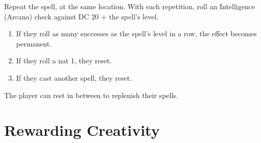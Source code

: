 \documentclass[twocolumn]{dndbook}
\begin{document}
Repeat the spell, at the same location. With each repetition, roll an Intelligence (Arcana) check against DC 20 + the spell's level.
\begin{enumerate}
	\item If they roll as many successes as the spell's level in a row, the effect becomes permanent.
	\item If they roll a nat 1, they reset.
	\item If they cast another spell, they reset.
\end{enumerate}

The player can rest in between to replenish their spells.









\chapter{Rewarding Creativity}




\end{document}
